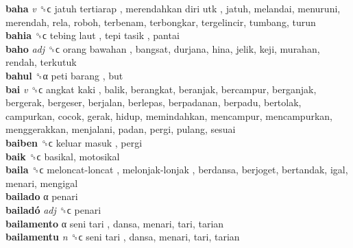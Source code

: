 \textbf{baha} \emph{v}  ␝ϲ   jatuh tertiarap ,  merendahkan diri utk , jatuh, melandai, menuruni, merendah, rela, roboh, terbenam, terbongkar, tergelincir, tumbang, turun  \\
\textbf{bahia} ␝ϲ   tebing laut ,  tepi tasik , pantai  \\
\textbf{baho} \emph{adj}  ␝ϲ   orang bawahan , bangsat, durjana, hina, jelik, keji, murahan, rendah, terkutuk  \\
\textbf{bahul} ␝α   peti barang , but  \\
\textbf{bai} \emph{v}  ␝ϲ   angkat kaki , balik, berangkat, beranjak, bercampur, berganjak, bergerak, bergeser, berjalan, berlepas, berpadanan, berpadu, bertolak, campurkan, cocok, gerak, hidup, memindahkan, mencampur, mencampurkan, menggerakkan, menjalani, padan, pergi, pulang, sesuai  \\
\textbf{baiben} ␝ϲ   keluar masuk , pergi  \\
\textbf{baik} ␝ϲ  basikal, motosikal  \\
\textbf{baila} ␝ϲ   meloncat-loncat ,  melonjak-lonjak , berdansa, berjoget, bertandak, igal, menari, mengigal  \\
\textbf{bailado} α  penari  \\
\textbf{bailadó} \emph{adj}  ␝ϲ  penari  \\
\textbf{bailamento} α   seni tari , dansa, menari, tari, tarian  \\
\textbf{bailamentu} \emph{n}  ␝ϲ   seni tari , dansa, menari, tari, tarian  \\
